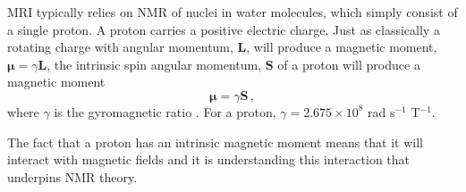 \ac{MRI} typically relies on \ac{NMR} of  nuclei in water molecules, which simply consist of a single proton.
A proton carries a positive electric charge.
Just as classically a rotating charge with angular momentum, $\mathbf{L}$, will produce a magnetic moment, $
\boldsymbol{\mu} = \gamma \mathbf{L}$, the intrinsic spin angular momentum, $\mathbf{S}$ of a proton will produce a magnetic moment 
\begin{equation}
\label{eq:magnmom}
\boldsymbol{\mu} = \gamma \mathbf{S} \,,
\end{equation}
where $\gamma$ is the gyromagnetic ratio \cite{Levitt2008}.
For a proton, $\gamma = 2.675 \times 10^8$ rad s$^{-1}$ T$^{-1}$.

The fact that a proton has an intrinsic magnetic moment means that it will interact with magnetic fields and it is understanding this interaction that underpins \ac{NMR} theory.


